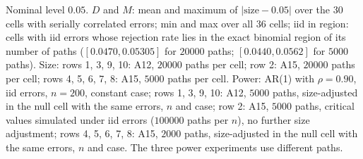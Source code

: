 Nominal level $0.05$. $D$ and $M$: mean and maximum of $|\text{size} - 0.05|$ over the 30 cells with serially correlated errors; min and max over all 36 cells; iid in region: cells with iid errors whose rejection rate lies in the exact binomial region of its number of paths ($[0.0470, 0.05305]$ for $20000$ paths; $[0.0440, 0.0562]$ for $5000$ paths). Size: rows 1, 3, 9, 10: A12, $20000$ paths per cell; row 2: A15, $20000$ paths per cell; rows 4, 5, 6, 7, 8: A15, $5000$ paths per cell. Power: AR(1) with $\rho = 0.90$, iid errors, $n = 200$, constant case; rows 1, 3, 9, 10: A12, $5000$ paths, size-adjusted in the null cell with the same errors, $n$ and case; row 2: A15, $5000$ paths, critical values simulated under iid errors ($100000$ paths per $n$), no further size adjustment; rows 4, 5, 6, 7, 8: A15, $2000$ paths, size-adjusted in the null cell with the same errors, $n$ and case. The three power experiments use different paths.
